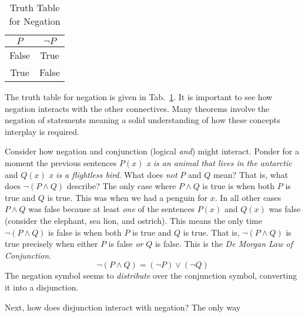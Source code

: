             \begin{table}
                \centering
                \begin{tabular}{c | c }
                    $P$&$\neg{P}$\\
                    \hline
                    False&True\\
                    \hline
                    True&False
                \end{tabular}
                \caption{Truth Table for Negation}
                \label{tab:truth_table_negation}
            \end{table}
            The truth table for negation is given in
            Tab.~\ref{tab:truth_table_negation}. It is important to see how
            negation interacts with the other connectives. Many theorems
            involve the negation of statements meaning a solid understanding of
            how these concepts interplay is required.
            \par\hfill\par
            Consider how negation and conjunction (logical \textit{and}) might
            interact. Ponder for a moment the previous sentences
            $P(x)$ \textit{x is an animal that lives in the antarctic} and
            $Q(x)$ \textit{x is a flightless bird}. What does
            \textit{not} $P$ and $Q$ mean? That is, what does
            $\neg(P\land{Q})$ describe? The only case where $P\land{Q}$ is true
            is when both $P$ is true and $Q$ is true. This was when we had a
            penguin for $x$. In all other cases $P\land{Q}$ was false because
            at least \textit{one} of the sentences $P(x)$ and $Q(x)$ was false
            (consider the elephant, sea lion, and ostrich). This means the only
            time $\neg(P\land{Q})$ is false is when both $P$ is true and $Q$ is
            true. That is, $\neg(P\land{Q})$ is true precisely when either $P$
            is false \textit{or} $Q$ is false. This is the
            \textit{De Morgan Law of Conjunction}.%
            \begin{equation}
                \neg(P\land{Q})=(\neg{P})\lor(\neg{Q})
            \end{equation}
            The negation symbol seems to \textit{distribute} over the
            conjunction symbol, converting it into a disjunction.
            \par\hfill\par
            Next, how does disjunction interact with negation? The only way
